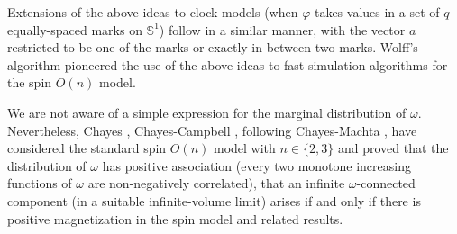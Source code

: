 \documentclass[english]{article}
\theoremstyle{plain}
\theoremstyle{plain}
\begin{document}
Extensions of the above ideas to clock models (when $\varphi$ takes
values in a set of $q$ equally-spaced marks on $\mathbb{S}^1$)
follow in a similar manner, with the vector $a$ restricted to be one
of the marks or exactly in between two marks. Wolff's algorithm
\cite{wolff1989collective} pioneered the use of the above ideas to
fast simulation algorithms for the spin $O(n)$ model.

We are not aware of a simple expression for the marginal
distribution of $\omega$. Nevertheless, Chayes \cite{chayes1998discontinuity},
Chayes-Campbell \cite{campbell1998isotropic}, following Chayes-Machta \cite{chayes1997graphical, chayes1998graphical}, have
considered the standard spin $O(n)$ model with $n\in \{2,3\}$ and
proved that the distribution of $\omega$ has positive association
(every two monotone increasing functions of $\omega$ are
non-negatively correlated), that an infinite $\omega$-connected
component (in a suitable infinite-volume limit) arises if and only
if there is positive magnetization in the spin model and related
results.
\end{document}
